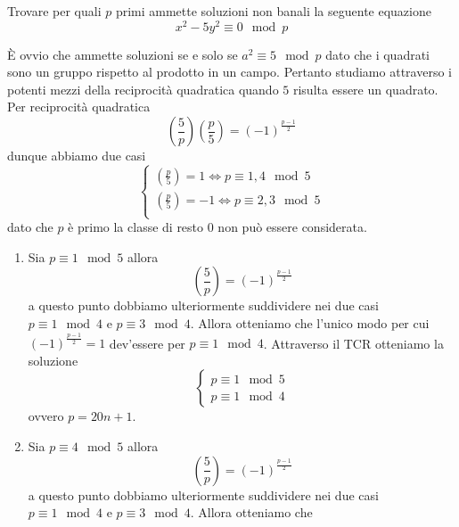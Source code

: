\begin{esercizio}
	Trovare per quali $p$ primi ammette soluzioni non banali la seguente equazione
	\begin{equation*}
		x^2 - 5y^2 \equiv 0 \mod p
	\end{equation*}
	
	È ovvio che ammette soluzioni se e solo se $a^2 \equiv 5 \mod p$ dato che i 
	quadrati sono un gruppo rispetto al prodotto in un campo. Pertanto studiamo
	attraverso i potenti mezzi della reciprocità quadratica quando $5$ risulta essere 
	un quadrato. Per reciprocità quadratica
	\begin{equation*}
		 \left(\frac{5}{p}\right) \left(\frac{p}{5}\right) = (-1)^{\frac{p-1}{2}}
	\end{equation*}
	dunque abbiamo due casi 
	\begin{equation*}
		\begin{cases}
			\left(\frac{p}{5}\right) = 1 \iff p \equiv  1, 4 \mod 5 \\
			\left(\frac{p}{5}\right) = -1 \iff p \equiv 2, 3 \mod 5 \\	
		\end{cases}
	\end{equation*}
	dato che $p$ è primo la classe di resto $0$ non può essere considerata.
	\begin{enumerate}
		\item Sia $p \equiv 1 \mod 5$ allora 
			\begin{equation*}
				\left(\frac{5}{p}\right) = (-1)^{\frac{p-1}{2}}
			\end{equation*}
			a questo punto dobbiamo ulteriormente suddividere nei due casi 
			$p \equiv 1 \mod 4$ e $p \equiv 3 \mod 4$. Allora otteniamo che
			l'unico modo per cui  $(-1)^{\frac{p-1}{2}}= 1$ dev'essere per
			$p \equiv 1 \mod 4$. Attraverso il TCR otteniamo la soluzione
			\begin{equation*}
				\begin{cases}
					p \equiv 1 \mod 5 \\
					p \equiv 1 \mod 4
				\end{cases}
			\end{equation*}
			ovvero $p = 20n + 1$.
		\item Sia $p \equiv 4 \mod 5$ allora 
			\begin{equation*}
				\left(\frac{5}{p}\right) = (-1)^{\frac{p-1}{2}}
			\end{equation*}
			a questo punto dobbiamo ulteriormente suddividere nei due casi 
			$p \equiv 1 \mod 4$ e $p \equiv 3 \mod 4$. Allora otteniamo che

\end{enumerate}
\end{esercizio}
